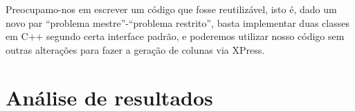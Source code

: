 \documentclass[letterpaper,11pt]{article}
\begin{document}
Preocupamo-nos em escrever um código que fosse reutilizável, isto é,
dado um novo par ``problema mestre''-``problema restrito'', basta
implementar duas classes em C++ segundo certa interface padrão, e
poderemos utilizar nosso código sem outras alterações para fazer a
geração de colunas via XPress.

\section{Análise de resultados}



\end{document}
